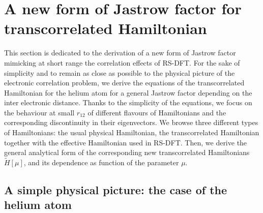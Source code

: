 \documentclass[aip,jcp,reprint,noshowkeys,superscriptaddress]{revtex4-1}
\begin{document}
\section{A new form of Jastrow factor for transcorrelated Hamiltonian}
This section is dedicated to the derivation of a new form of Jastrow factor mimicking at short range the correlation effects of RS-DFT. 
For the sake of simplicity and to remain as close as possible to the physical picture of the electronic correlation problem, 
we derive the equations of the transcorrelated Hamiltonian for the helium atom for a general Jastrow factor depending on the inter electronic distance.  
Thanks to the simplicity of the equations, we focus on the behaviour at small $r_{12}$ of different flavours of Hamiltonians 
and the corresponding discontinuity in their eigenvectors. 
We browse three different types of Hamiltonians: the usual physical Hamiltonian, the transcorrelated Hamiltonian together with the effective Hamiltonian used in RS-DFT.
Then, we derive the general analytical form of the corresponding new transcorrelated Hamiltonians $\tilde{H}[\mu]$, and its dependence as function of the parameter $\mu$. 

\subsection{A simple physical picture: the case of the helium atom}
\end{document}
